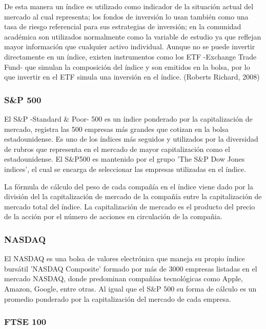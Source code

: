 \documentclass[a4paper,12pt]{Latex/Classes/PhDthesisPSnPDF}
\begin{document}
De esta manera un índice es utilizado como indicador de la situación actual del mercado al cual representa; los fondos de inversión lo usan también como una tasa de riesgo referencial para sus estrategias de inversión; en la comunidad académica son utilizados normalmente como la variable de estudio ya que reflejan mayor información que cualquier activo individual. Aunque no se puede invertir directamente en un índice, existen instrumentos como los ETF -Exchange Trade Fund- que simulan la composición del índice y son emitidos en la bolsa, por lo que invertir en el ETF simula una inversión en el índice. (Roberts Richard, 2008)

\subsubsection{S\&P 500}

El S\&P -Standard \& Poor- 500 es un índice ponderado por la capitalización de mercado, registra las 500 empresas más grandes que cotizan en la bolsa estadounidense. Es uno de los índices más seguidos y utilizados por la diversidad de rubros que representa en el mercado de mayor capitalización como el estadounidense. El S\&P500 es mantenido por el grupo 'The S\&P Dow Jones indices', el cual se encarga de seleccionar las empresas utilizadas en el índice. 

La fórmula de cálculo del peso de cada compañía en el índice viene dado por la división del la capitalización de mercado de la compañía entre la capitalización de mercado total del índice. La capitalización de mercado es el producto del precio de la acción por el número de acciones en circulación de la compañia.

\subsubsection{NASDAQ}

El NASDAQ es una bolsa de valores electrónica que maneja su propio índice bursátil 'NASDAQ Composite' formado por más de 3000 empresas listadas en el mercado NASDAQ, donde predominan compañías tecnológicas como Apple, Amazon, Google, entre otras. Al igual que el S\&P 500 su forma de cálculo es un promedio ponderado por la capitalización del mercado de cada empresa. 

\subsubsection{FTSE 100}
\end{document}
